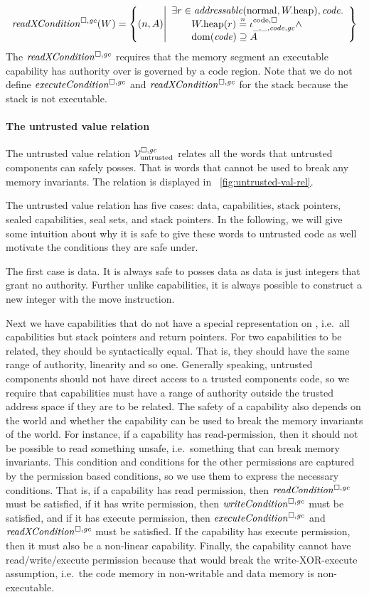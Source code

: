 \begin{jversion}
\[
  \xReadCond{W} = \left\{ \npair{A} \middle| 
    \begin{array}{l}
      \exists r \in \addressable{\normal, \pwheap}, \code \ldotp \\
      \qquad \pwheap(r) \nequal \codereg{\_,\_,\code,\gc}\wedge\\
      \qquad \dom(\code) \supseteq A 
    \end{array}
  \right\}
\]
The $\xReadCond{}$ requires that the memory segment an executable capability has authority over is governed by a code region.
Note that we do not define $\execCond{}$ and $\xReadCond{}$ for the stack because the stack is not executable.

\paragraph{The untrusted value relation}
\label{par:untrusted-val-rel}
The untrusted value relation $\mathcal{V}^{\square,\mathit{gc}}_{\mathrm{untrusted}}$ relates all the words that untrusted components can safely posses.
That is words that cannot be used to break any memory invariants.
The relation is displayed in \figurename~\ref{fig:untrusted-val-rel}.

The untrusted value relation has five cases: data, capabilities, stack pointers, sealed capabilities, seal sets, and stack pointers.
In the following, we will give some intuition about why it is safe to give these words to untrusted code as well motivate the conditions they are safe under.

The first case is data.
It is always safe to posses data as data is just integers that grant no authority.
Further unlike capabilities, it is always possible to construct a new integer with the move instruction.

Next we have capabilities that do not have a special representation on \srccm{}, i.e.\ all capabilities but stack pointers and return pointers.
For two capabilities to be related, they should be syntactically equal.
That is, they should have the same range of authority, linearity and so one.
Generally speaking, untrusted components should not have direct access to a trusted components code, so we require that capabilities must have a range of authority outside the trusted address space if they are to be related.
The safety of a capability also depends on the world and whether the capability can be used to break the memory invariants of the world.
For instance, if a capability has read-permission, then it should not be possible to read something unsafe, i.e.\ something that can break memory invariants.
This condition and conditions for the other permissions are captured by the permission based conditions, so we use them to express the necessary conditions.
That is, if a capability has read permission, then $\readCond{}$ must be satisfied, if it has write permission, then $\writeCond{}$ must be satisfied, and if it has execute permission, then $\execCond{}$ and $\xReadCond{}$ must be satisfied.
If the capability has execute permission, then it must also be a non-linear capability.
Finally, the capability cannot have read/write/execute permission because that would break the write-XOR-execute assumption, i.e.\ the code memory in non-writable and data memory is non-executable.


\end{jversion}

